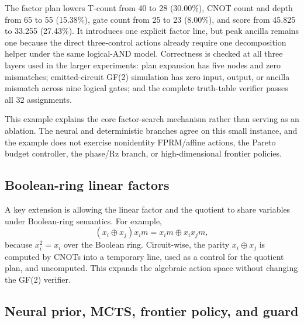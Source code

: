 \documentclass[11pt]{article}
\newcommand{\xor}{\ensuremath{\oplus}}
\begin{document}
\begin{table}[htbp]
\centering
\scriptsize
\setlength{\tabcolsep}{3pt}
\caption{Logical resources for the worked example.  Factor anc. counts
explicit reusable factor lines; peak ancilla also includes decomposition
helpers.  Verified denotes complete truth-table assignments passed.}
\label{tab:worked-example-resources}
\resizebox{\linewidth}{!}{}
\end{table}

The factor plan lowers T-count from 40 to 28 (30.00\%), CNOT count and depth
from 65 to 55 (15.38\%), gate count from 25 to 23 (8.00\%), and score from
45.825 to 33.255 (27.43\%).  It introduces one explicit factor line, but peak
ancilla remains one because the direct three-control actions already require
one decomposition helper under the same logical-AND model.  Correctness is
checked at all three layers used in the larger experiments: plan expansion
has five nodes and zero mismatches; emitted-circuit GF(2) simulation has zero
input, output, or ancilla mismatch across nine logical gates; and the complete
truth-table verifier passes all 32 assignments.

This example explains the core factor-search mechanism rather than serving as
an ablation.  The neural and deterministic branches agree on this small
instance, and the example does not exercise nonidentity FPRM/affine actions,
the Pareto budget controller, the phase/Rz branch, or high-dimensional
frontier policies.

\subsection{Boolean-ring linear factors}

A key extension is allowing the linear factor and the quotient to share
variables under Boolean-ring semantics.  For example,
\begin{equation}
  (x_i\xor x_j)x_i m = x_i m \xor x_i x_j m,
  \label{eq:boolean-ring}
\end{equation}
because $x_i^2=x_i$ over the Boolean ring.  Circuit-wise, the parity
$x_i\xor x_j$ is computed by CNOTs into a temporary line, used as a control for
the quotient plan, and uncomputed.  This expands the algebraic action space
without changing the GF(2) verifier.

\subsection{Neural prior, MCTS, frontier policy, and guard}
\end{document}

